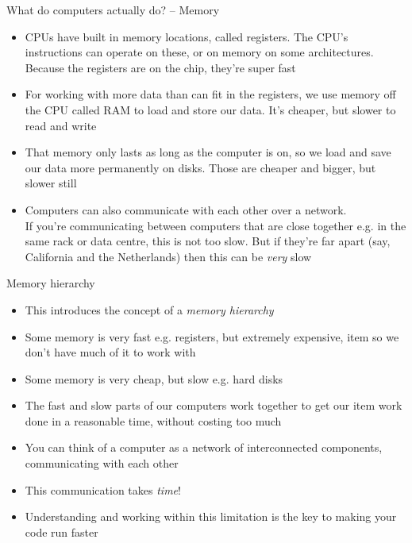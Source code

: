 \documentclass{beamer}
\begin{document}
\begin{frame}{What do computers actually do? -- Memory}
	\begin{itemize}
		\item CPUs have built in memory locations, called registers. The CPU's
		instructions can operate on these, or on memory on some architectures.
		Because the registers are on the chip, they're super fast
		
		\item For working with more data than can fit in the registers, we use
		memory off the CPU called RAM to load and store our data. It's cheaper,
		but slower to read and write
		
		\item That memory only lasts as long as the computer is on, so we load
		and save our data more permanently on disks. Those are cheaper and
		bigger, but slower still
		
		\item Computers can also communicate with each other over a network.
			\\
			If you're communicating between computers that
			are close together e.g. in the same rack or data centre, this is not too slow.
			But if they're far apart (say, California
			and the Netherlands) then this can be \emph{very} slow
	\end{itemize}
\end{frame}

\begin{frame}{Memory hierarchy}
	\begin{itemize}
		\item This introduces the concept of a \emph{memory hierarchy}
		\item Some memory is very fast e.g. registers, but extremely expensive,
		item so we don't have much of it to work with
		\item Some memory is very cheap, but slow e.g. hard disks
		\item The fast and slow parts of our computers work together to get our
		item work done in a reasonable time, without costing too much
		\item You can think of a computer as a network of interconnected components,
		communicating with each other
		\item This communication takes \emph{time}!
		\item Understanding and working within this limitation is the key to
		making your code run faster
	\end{itemize}
\end{frame}
\end{document}
